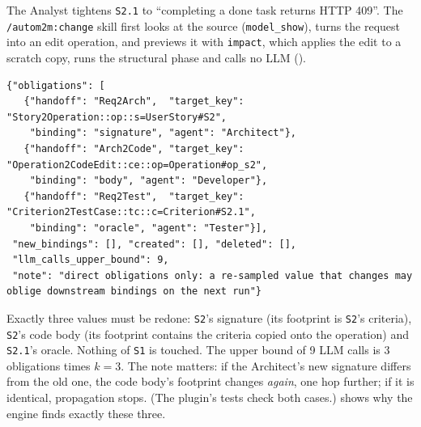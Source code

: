 \documentclass[10pt,a4paper]{article}
\newcommand{\code}[1]{\texttt{#1}}
\newcommand{\mcptool}[1]{\texttt{#1}}
\newcommand{\skill}[1]{\texttt{/autom2m:#1}}
\begin{document}
The Analyst tightens \code{S2.1} to ``completing a done task returns HTTP
409''. The \skill{change} skill first looks at the source
(\mcptool{model\_show}), turns the request into an edit operation, and
previews it with \mcptool{impact}, which applies the edit to a scratch copy,
runs the structural phase and calls no LLM ().

\begin{lstlisting}[style=engine, caption={Observed: \code{impact} for the edit \code{\{"op": "set", "key": "Criterion\#S2.1", "values": \{"text": ...\}\}} of view \code{Req} as the Analyst.}, label={lst:w1impact}]
{"obligations": [
   {"handoff": "Req2Arch",  "target_key": "Story2Operation::op::s=UserStory#S2",
    "binding": "signature", "agent": "Architect"},
   {"handoff": "Arch2Code", "target_key": "Operation2CodeEdit::ce::op=Operation#op_s2",
    "binding": "body", "agent": "Developer"},
   {"handoff": "Req2Test",  "target_key": "Criterion2TestCase::tc::c=Criterion#S2.1",
    "binding": "oracle", "agent": "Tester"}],
 "new_bindings": [], "created": [], "deleted": [],
 "llm_calls_upper_bound": 9,
 "note": "direct obligations only: a re-sampled value that changes may oblige downstream bindings on the next run"}
\end{lstlisting}

Exactly three values must be redone: \code{S2}'s signature (its footprint is
\code{S2}'s criteria), \code{S2}'s code body (its footprint contains the
criteria copied onto the operation) and \code{S2.1}'s oracle. Nothing of
\code{S1} is touched. The upper bound of 9 LLM calls is 3 obligations times
$k=3$. The note matters: if the Architect's new signature differs from the
old one, the code body's footprint changes \emph{again}, one hop further; if
it is identical, propagation stops. (The plugin's tests check both cases.)
 shows why the engine finds exactly these three.
\end{document}
